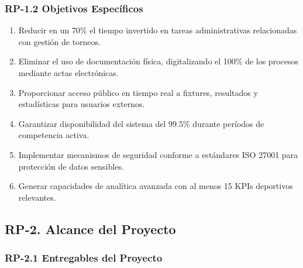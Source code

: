 \documentclass[12pt,a4paper]{article}
\begin{document}
\subsubsection{RP-1.2 Objetivos Específicos}

\begin{enumerate}[noitemsep]
    \item Reducir en un 70\% el tiempo invertido en tareas administrativas relacionadas con gestión de torneos.
    \item Eliminar el uso de documentación física, digitalizando el 100\% de los procesos mediante actas electrónicas.
    \item Proporcionar acceso público en tiempo real a fixtures, resultados y estadísticas para usuarios externos.
    \item Garantizar disponibilidad del sistema del 99.5\% durante períodos de competencia activa.
    \item Implementar mecanismos de seguridad conforme a estándares ISO 27001 para protección de datos sensibles.
    \item Generar capacidades de analítica avanzada con al menos 15 KPIs deportivos relevantes.
\end{enumerate}

\subsection{RP-2. Alcance del Proyecto}

\subsubsection{RP-2.1 Entregables del Proyecto}
\end{document}
